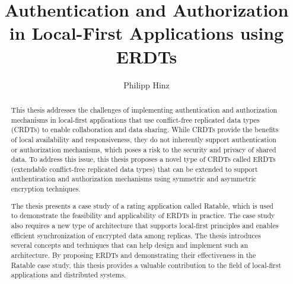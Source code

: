 \documentclass[
	ngerman,
	ruledheaders=section,   %
	class=report,		    %
	thesis={type=bachelor}, %
	accentcolor=9c,			%
	custommargins=true,    %
	marginpar=false,        %
	parskip=half-,          %
	fontsize=11pt,          %
]{tudapub}
\begin{document}

\title{Authentication and Authorization in Local-First Applications using ERDTs}
\author[P. Hinz]{Philipp Hinz} %



\submissiondate{\today}
\examdate{\today}

\maketitle

\affidavit

\tableofcontents

\begin{abstract}
This thesis addresses the challenges of implementing authentication and authorization mechanisms in local-first applications that use conflict-free replicated data types (CRDTs) to enable collaboration and data sharing. While CRDTs provide the benefits of local availability and responsiveness, they do not inherently support authentication or authorization mechanisms, which poses a risk to the security and privacy of shared data. To address this issue, this thesis proposes a novel type of CRDTs called ERDTs (extendable conflict-free replicated data types) that can be extended to support authentication and authorization mechanisms using symmetric and asymmetric encryption techniques.

The thesis presents a case study of a rating application called Ratable, which is used to demonstrate the feasibility and applicability of ERDTs in practice. The case study also requires a new type of architecture that supports local-first principles and enables efficient synchronization of encrypted data among replicas. The thesis introduces several concepts and techniques that can help design and implement such an architecture. By proposing ERDTs and demonstrating their effectiveness in the Ratable case study, this thesis provides a valuable contribution to the field of local-first applications and distributed systems.
\end{abstract}
\end{document}
